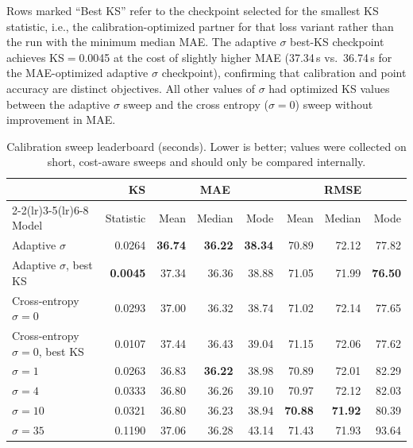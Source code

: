\documentclass{article}
\begin{document}
Rows marked ``Best KS'' refer to the checkpoint selected for the smallest KS statistic, i.e., the calibration-optimized partner for that loss variant rather than the run with the minimum median MAE. The adaptive \(\sigma\) best-KS checkpoint achieves KS\(=\)0.0045 at the cost of slightly higher MAE (37.34\,s vs.\ 36.74\,s for the MAE-optimized adaptive \(\sigma\) checkpoint), confirming that calibration and point accuracy are distinct objectives. All other values of \(\sigma\) had optimized KS values between the adaptive \(\sigma\) sweep and the cross entropy (\(\sigma = 0\)) sweep without improvement in MAE.
\begin{table}[h]
\centering
\caption{Calibration sweep leaderboard (seconds). Lower is better; values were collected on short, cost-aware sweeps and should only be compared internally.}
\label{tab:calib-leaderboard}
\begin{tabular}{l r rrr rrr}
\toprule
& KS & \multicolumn{3}{c}{MAE} & \multicolumn{3}{c}{RMSE} \\
\cmidrule(lr){2-2}\cmidrule(lr){3-5}\cmidrule(lr){6-8}
Model & Statistic & Mean & Median & Mode & Mean & Median & Mode \\
\midrule
Adaptive \(\sigma\) & 0.0264 & \textbf{36.74} & \textbf{36.22} & \textbf{38.34} & 70.89 & 72.12 & 77.82 \\
Adaptive \(\sigma\), best KS & \textbf{0.0045} & 37.34 & 36.36 & 38.88 & 71.05 & 71.99 & \textbf{76.50} \\
Cross-entropy \(\sigma=0\) & 0.0293 & 37.00 & 36.32 & 38.74 & 71.02 & 72.14 & 77.65 \\
Cross-entropy \(\sigma=0\), best KS & 0.0107 & 37.44 & 36.43 & 39.04 & 71.15 & 72.06 & 77.62 \\
\(\sigma=1\) & 0.0263 & 36.83 & \textbf{36.22} & 38.98 & 70.89 & 72.01 & 82.29 \\
\(\sigma=4\) & 0.0333 & 36.80 & 36.26 & 39.10 & 70.97 & 72.12 & 82.03 \\
\(\sigma=10\) & 0.0321 & 36.80 & 36.23 & 38.94 & \textbf{70.88} & \textbf{71.92} & 80.39 \\
\(\sigma=35\) & 0.1190 & 37.06 & 36.28 & 43.14 & 71.43 & 71.93 & 93.64 \\
\bottomrule
\end{tabular}
\end{table}
\end{document}
